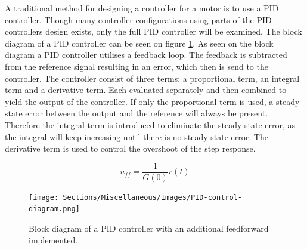 \documentclass[../../main.tex]{subfiles}
\begin{document}
A traditional method for designing a controller for a motor is to use a PID controller. Though many controller configurations using parts of the PID controllers design exists, only the full PID controller will be examined. The block diagram of a PID controller can be seen on figure \ref{fig:PID_controller}. As seen on the block diagram
a PID controller utilises a feedback loop. The feedback is subtracted from the reference signal resulting in an error, which then is send to the controller. The controller consist of three terms: a proportional term, an integral term and a derivative term. Each evaluated separately and then combined to yield the output of the controller. If only the proportional term is used, a steady state error between the output and the reference will always be present. Therefore the integral term is introduced to eliminate the steady state error, as the integral will keep increasing until there is no steady state error. The derivative term is used to control the overshoot of the step response.

\begin{equation}\label{eq:feedforward}
    u_{ff}=\frac{1}{G(0)}r(t)
\end{equation}
\begin{figure}[]
    \centering
    \texttt{[image: Sections/Miscellaneous/Images/PID-control-diagram.png]}
    \caption{Block diagram of a PID controller with an additional feedforward implemented.}
    \label{fig:PID_controller}
\end{figure}

\end{document}
